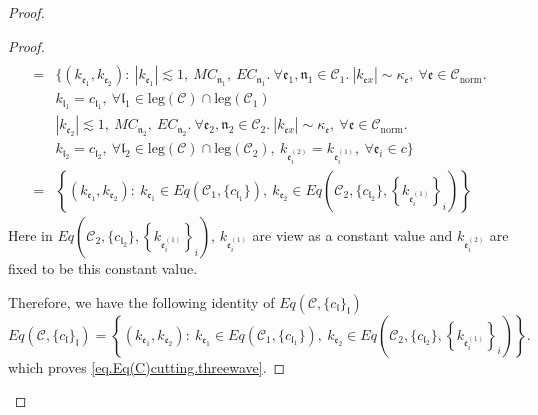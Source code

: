 \begin{proof}
\begin{proof}
\begin{equation}
\begin{split}
    \\
    =&\{(k_{\mathfrak{e}_1},k_{\mathfrak{e}_2}):\ |k_{\mathfrak{e}_1}| \lesssim 1,\ MC_{\mathfrak{n}_1},\  EC_{\mathfrak{n}_1}.\ \forall \mathfrak{e}_1, \mathfrak{n}_1\in\mathcal{C}_1.\ |k_{\mathfrak{e}x}| \sim \kappa_{\mathfrak{e}},\ \forall \mathfrak{e}\in \mathcal{C}_{\text{norm}}.
    \\
    &k_{\mathfrak{l}_1}=c_{\mathfrak{l}_1},\ \forall \mathfrak{l}_1\in \text{leg}(\mathcal{C})\cap \text{leg}(\mathcal{C}_1)
    \\
    &|k_{\mathfrak{e}_2}| \lesssim 1,\ MC_{\mathfrak{n}_2},\  EC_{\mathfrak{n}_2}.\ \forall \mathfrak{e}_2, \mathfrak{n}_2\in\mathcal{C}_2.\ |k_{\mathfrak{e}x}| \sim \kappa_{\mathfrak{e}},\ \forall \mathfrak{e}\in \mathcal{C}_{\text{norm}}.
    \\
    &k_{\mathfrak{l}_2}=c_{\mathfrak{l}_2},\ \forall \mathfrak{l}_2\in \text{leg}(\mathcal{C})\cap \text{leg}(\mathcal{C}_2),\ k_{\mathfrak{e}_{i}^{(2)}}=k_{\mathfrak{e}_{i}^{(1)}},\ \forall\mathfrak{e}_{i}\in c\}
    \\
    =&\left\{(k_{\mathfrak{e}_1},k_{\mathfrak{e}_{2}}):\ k_{\mathfrak{e}_1}\in Eq(\mathcal{C}_1,\{c_{\mathfrak{l}_1}\}),\  k_{\mathfrak{e}_{2}}\in Eq\left(\mathcal{C}_{2}, \{c_{\mathfrak{l}_2}\}, \left\{k_{\mathfrak{e}_{i}^{(1)}}\right\}_{i}\right)\right\}
\end{split}
\end{equation}
Here in $Eq\left(\mathcal{C}_{2}, \{c_{\mathfrak{l}_2}\}, \left\{k_{\mathfrak{e}_{i}^{(1)}}\right\}_{i}\right)$, $k_{\mathfrak{e}_{i}^{(1)}}$ are view as a constant value and $k_{\mathfrak{e}_{i}^{(2)}}$ are fixed to be this constant value.

Therefore, we have the following identity of $Eq(\mathcal{C},\{c_{\mathfrak{l}}\}_{\mathfrak{l}})$
\begin{equation}
    Eq(\mathcal{C},\{c_{\mathfrak{l}}\}_{\mathfrak{l}})=\left\{(k_{\mathfrak{e}_1},k_{\mathfrak{e}_{2}}):\ k_{\mathfrak{e}_1}\in Eq(\mathcal{C}_1,\{c_{\mathfrak{l}_1}\}),\  k_{\mathfrak{e}_{2}}\in Eq\left(\mathcal{C}_{2}, \{c_{\mathfrak{l}_2}\}, \left\{k_{\mathfrak{e}_{i}^{(1)}}\right\}_{i}\right)\right\}.
\end{equation}
which proves \eqref{eq.Eq(C)cutting.threewave}.


\end{proof}
\end{proof}
